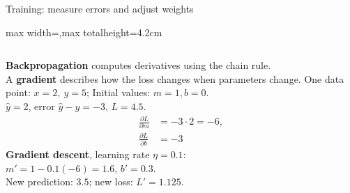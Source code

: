 \documentclass[aspectratio=169,11pt]{beamer}
\begin{document}
\begin{frame}[fragile]{Training: measure errors and adjust weights}
\centering
\begin{adjustbox}{max width=\linewidth,max totalheight=4.2cm}
\end{adjustbox}
\vspace{3mm}
\begin{columns}[T,onlytextwidth]
\textbf{Backpropagation} computes derivatives using the chain rule.\\[2mm]
A \textbf{gradient} describes how the loss changes when parameters change.
\small
One data point: $x=2,\ y=5$; Initial values: $m=1,b=0$.\\
$\hat y=2$, error $\hat y-y=-3$, $L=4.5$.
\[
\begin{aligned}
\frac{\partial L}{\partial m}&=-3\cdot2=-6,\\
\frac{\partial L}{\partial b}&=-3
\end{aligned}
\]
\textbf{Gradient descent}, learning rate $\eta=0.1$:\\
$m'=1-0.1(-6)=1.6$, $b'=0.3$.\\
New prediction: $3.5$; new loss: $L'=1.125$.
\end{columns}
\end{frame}
\end{document}
